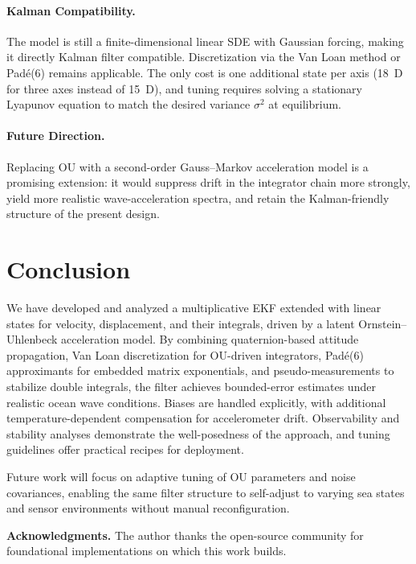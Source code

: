 \documentclass[10pt]{extarticle}
\begin{document}
\paragraph{Kalman Compatibility.}
The model is still a finite-dimensional linear SDE with Gaussian forcing, making it
directly Kalman filter compatible. Discretization via the Van Loan method or Pad\'e(6)
remains applicable. The only cost is one additional state per axis (18~D for three axes
instead of 15~D), and tuning requires solving a stationary Lyapunov equation to match
the desired variance $\sigma^2$ at equilibrium.

\paragraph{Future Direction.}
Replacing OU with a second-order Gauss--Markov acceleration model is a promising extension:
it would suppress drift in the integrator chain more strongly, yield more realistic
wave-acceleration spectra, and retain the Kalman-friendly structure of the present design.

\section{Conclusion}
\label{sec:conclusion}

We have developed and analyzed a multiplicative EKF extended with linear
states for velocity, displacement, and their integrals, driven by a latent
Ornstein--Uhlenbeck acceleration model. By combining quaternion-based attitude
propagation, Van Loan discretization for OU-driven integrators, Pad\'e(6)
approximants for embedded matrix exponentials, and pseudo-measurements to
stabilize double integrals, the filter achieves bounded-error estimates under
realistic ocean wave conditions. Biases are handled explicitly, with additional
temperature-dependent compensation for accelerometer drift. Observability and
stability analyses demonstrate the well-posedness of the approach, and tuning
guidelines offer practical recipes for deployment.

Future work will focus on adaptive tuning of OU parameters and noise covariances,
enabling the same filter structure to self-adjust to varying sea states and sensor
environments without manual reconfiguration.

\vspace{1em}
\noindent\textbf{Acknowledgments.}  
The author thanks the open-source community for foundational implementations
on which this work builds.
\end{document}
